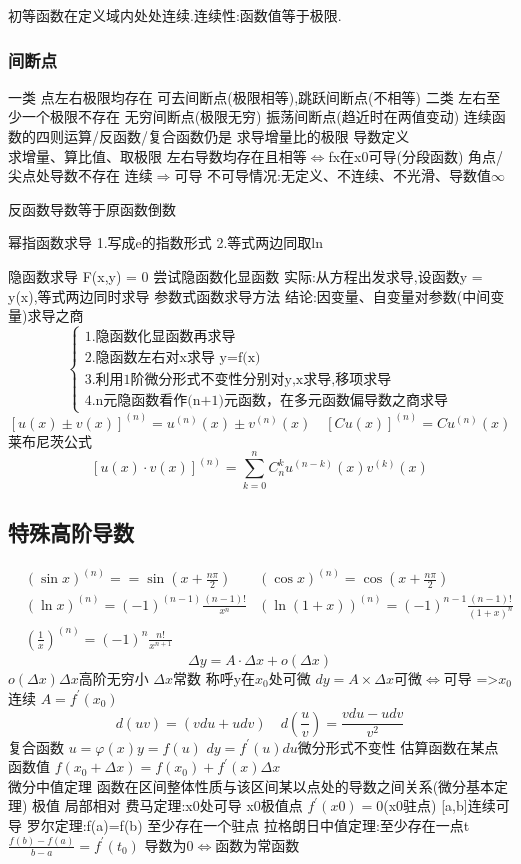 \documentclass[10pt, a4paper, oneside]{ctexart}
\begin{document}
\begin{sloppypar}
	初等函数在定义域内处处连续.连续性:函数值等于极限.
	\subsubsection{间断点}
	一类 点左右极限均存在 可去间断点(极限相等),跳跃间断点(不相等)
	二类 左右至少一个极限不存在 无穷间断点(极限无穷) 振荡间断点(趋近时在两值变动)
	连续函数的四则运算/反函数/复合函数仍是
	求导增量比的极限
	导数定义\\
	求增量、算比值、取极限
	左右导数均存在且相等$\Leftrightarrow$fx在x0可导(分段函数)
	角点/尖点处导数不存在
	连续$\Rightarrow$可导
	不可导情况:无定义、不连续、不光滑、导数值$\infty$

	反函数导数等于原函数倒数

	幂指函数求导
	1.写成e的指数形式
	2.等式两边同取ln

	隐函数求导
	F(x,y) = 0
	尝试隐函数化显函数
	实际:从方程出发求导,设函数y = y(x),等式两边同时求导
	参数式函数求导方法
	结论:因变量、自变量对参数(中间变量)求导之商
	$$
		\begin{cases}
			1.\text{隐函数化显函数再求导}                        \\
			2.\text{隐函数左右对x求导 y=f(x)}                    \\
			3.\text{利用1阶微分形式不变性分别对y,x求导,移项求导} \\
			4.\text{n元隐函数看作(n+1)元函数，在多元函数偏导数之商求导}
		\end{cases}
	$$
	$$
		[u(x)\pm v(x)]^{(n)}=u^{(n)}(x)\pm v^{(n)}(x) \quad [Cu(x)]^{(n)}=Cu^{(n)}(x)$$
	莱布尼茨公式
	$$
		[u(x)\cdot v(x)]^{(n)}=\sum_{k=0}^{n}C_n^k u^{(n-k)}(x)v^{(k)}(x)
	$$

	\subsection{特殊高阶导数}
	\begin{align*}
		 & (\sin x)^{(n)}==\sin(x+\frac{n\pi}{2})
		 & (\cos x)^{(n)}=\cos(x+\frac{n\pi}{2})                                                            \\
		 & (\ln x)^{(n)}=(-1)^{(n-1)}\frac{(n-1)!}{x^n} & (\ln(1+x))^{(n)}=(-1)^{n-1}\frac{(n-1)!}{(1+x)^n} \\
		 & (\frac{1}{x})^{(n)}=(-1)^n\frac{n!}{x^{n+1}}
	\end{align*}
	$$\Delta y = A\cdot\Delta x + o(\Delta x)$$
	$o(\Delta x)\Delta x$高阶无穷小 $\Delta x$常数 称呼y在$x_0$处可微
	$dy = A\times\Delta x $可微$\Leftrightarrow$可导
	=>$x_0$连续
	$A = f^{\prime}(x_0)$
	$$d(uv) = (vdu + udv)\quad d(\frac{u}{v}) =\frac{vdu - udv}{v^2}$$
	复合函数
	$u = \varphi(x) y=f(u)$
	$dy = f^{\prime}(u)du$微分形式不变性
	估算函数在某点函数值 $f(x_0 + \Delta x) = f(x_0)  + f^{\prime}(x)\Delta x$
	\vspace*{1\baselineskip} \\
	微分中值定理 函数在区间整体性质与该区间某以点处的导数之间关系(微分基本定理)
	极值 局部相对
	费马定理:x0处可导 x0极值点 $f^{\prime}(x0) = 0$(x0驻点)
	[a,b]连续可导
	罗尔定理:f(a)=f(b) 至少存在一个驻点
	拉格朗日中值定理:至少存在一点t $\frac{f(b)-f(a)}{b-a} = f^{\prime}(t_0)$
	导数为0$\Leftrightarrow$函数为常函数


\end{sloppypar}
\end{document}
